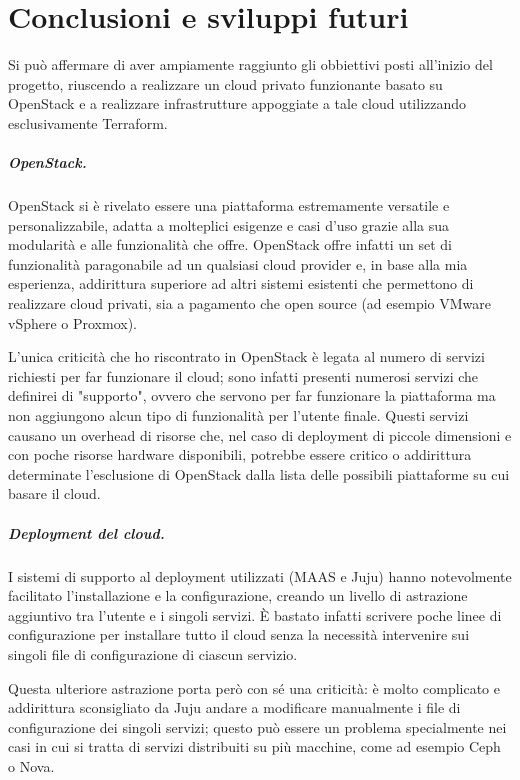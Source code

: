\chapter{Conclusioni e sviluppi futuri}

Si può affermare di aver ampiamente raggiunto gli obbiettivi posti all'inizio del progetto, riuscendo a realizzare un cloud privato funzionante basato su OpenStack e a realizzare infrastrutture appoggiate a tale cloud utilizzando esclusivamente Terraform.

\paragraph{OpenStack.} OpenStack si è rivelato essere una piattaforma estremamente versatile e personalizzabile, adatta a molteplici esigenze e casi d'uso grazie alla sua modularità e alle funzionalità che offre. OpenStack offre infatti un set di funzionalità paragonabile ad un qualsiasi cloud provider e, in base alla mia esperienza, addirittura superiore ad altri sistemi esistenti che permettono di realizzare cloud privati, sia a pagamento che open source (ad esempio VMware vSphere o Proxmox).

L'unica criticità che ho riscontrato in OpenStack è legata al numero di servizi richiesti per far funzionare il cloud; sono infatti presenti numerosi servizi che definirei di "supporto", ovvero che servono per far funzionare la piattaforma ma non aggiungono alcun tipo di funzionalità per l'utente finale. Questi servizi causano un overhead di risorse che, nel caso di deployment di piccole dimensioni e con poche risorse hardware disponibili, potrebbe essere critico o addirittura determinate l'esclusione di OpenStack dalla lista delle possibili piattaforme su cui basare il cloud.

\paragraph{Deployment del cloud.} I sistemi di supporto al deployment utilizzati (MAAS e Juju) hanno notevolmente facilitato l'installazione e la configurazione, creando un livello di astrazione aggiuntivo tra l'utente e i singoli servizi. È bastato infatti scrivere poche linee di configurazione per installare tutto il cloud senza la necessità intervenire sui singoli file di configurazione di ciascun servizio.

Questa ulteriore astrazione porta però con sé una criticità: è molto complicato e addirittura sconsigliato da Juju andare a modificare manualmente i file di configurazione dei singoli servizi; questo può essere un problema specialmente nei casi in cui si tratta di servizi distribuiti su più macchine, come ad esempio Ceph o Nova.

